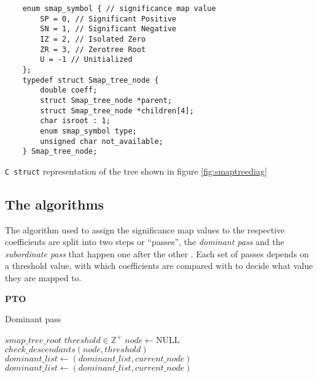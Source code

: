 \documentclass[./A14_Report.tex]{subfiles}
\begin{document}
\begin{code}
    \begin{verbatim}
    enum smap_symbol { // significance map value
        SP = 0, // Significant Positive
        SN = 1, // Significant Negative
        IZ = 2, // Isolated Zero
        ZR = 3, // Zerotree Root
        U = -1 // Unitialized
    };
    typedef struct Smap_tree_node {
        double coeff;
        struct Smap_tree_node *parent;
        struct Smap_tree_node *children[4];
        char isroot : 1;
        enum smap_symbol type;
        unsigned char not_available;
    } Smap_tree_node;
    \end{verbatim}
    \caption{\texttt{C struct} representation of the tree shown in figure \ref{fig:smaptreediag}}
    \label{code:sbtreedef}
\end{code}

\subsection{The algorithms}
The algorithm used to assign the significance map values to the respective
coefficients are split into two steps or ``passes'', the \textit{dominant pass}
and the \textit{subordinate pass} that happen one after the other \cite{shap1993}. Each set of
passes depends on a threshold value, with which coefficients are compared with
to decide what value they are mapped to.
\par
\textbf{PTO}

\begin{algorithm}[H]
    \caption{Dominant pass}
    \label{alg:dompass}
    \begin{algorithmic}
        \Require $smap\_tree\_root$ 
        \Require $threshold \in \mathbb{Z}^+$
        \State $node \gets \text{NULL}$
            \State $check\_descendants(node, threshold)$
                \State $dominant\_list \gets (dominant\_list, current\_node)$
                    \State $dominant\_list \gets (dominant\_list, current\_node)$
                \EndIf
            \EndIf
        \EndFor
    \end{algorithmic}
\end{algorithm}
\end{document}
